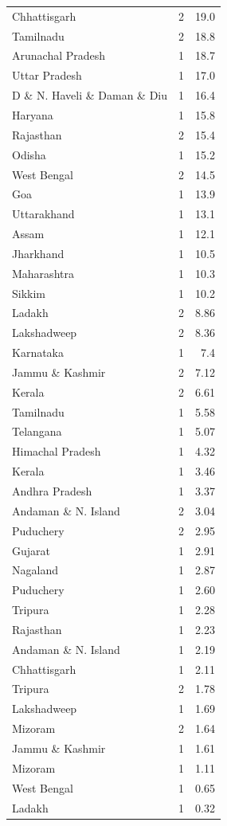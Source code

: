 \documentclass{article}
\begin{document}
\begin{longtable}{llr}
	Chhattisgarh & 2 & 19.0 \\
	Tamilnadu & 2 & 18.8 \\
	Arunachal Pradesh & 1 & 18.7 \\
	Uttar Pradesh & 1 & 17.0 \\
	D \& N. Haveli \& Daman \& Diu & 1 & 16.4 \\
	Haryana & 1 & 15.8 \\
	Rajasthan & 2 & 15.4 \\
	Odisha & 1 & 15.2 \\
	West Bengal & 2 & 14.5 \\
	Goa & 1 & 13.9 \\
	Uttarakhand & 1 & 13.1 \\
	Assam & 1 & 12.1 \\
	Jharkhand & 1 & 10.5 \\
	Maharashtra & 1 & 10.3 \\
	Sikkim & 1 & 10.2 \\
	Ladakh & 2 & 8.86 \\
	Lakshadweep & 2 & 8.36 \\
	Karnataka & 1 & 7.4 \\
	Jammu \& Kashmir & 2 & 7.12 \\
	Kerala & 2 & 6.61 \\
	Tamilnadu & 1 & 5.58 \\
	Telangana & 1 & 5.07 \\
	Himachal Pradesh & 1 & 4.32 \\
	Kerala & 1 & 3.46 \\
	Andhra Pradesh & 1 & 3.37 \\
	Andaman \& N. Island & 2 & 3.04 \\
	Puduchery & 2 & 2.95 \\
	Gujarat & 1 & 2.91 \\
	Nagaland & 1 & 2.87 \\
	Puduchery & 1 & 2.60 \\
	Tripura & 1 & 2.28 \\
	Rajasthan & 1 & 2.23 \\
	Andaman \& N. Island & 1 & 2.19 \\
	Chhattisgarh & 1 & 2.11 \\
	Tripura & 2 & 1.78 \\
	Lakshadweep & 1 & 1.69 \\
	Mizoram & 2 & 1.64 \\
	Jammu \& Kashmir & 1 & 1.61 \\
	Mizoram & 1 & 1.11 \\
	West Bengal & 1 & 0.65 \\
	Ladakh & 1 & 0.32 \\
	
\end{longtable}
\newpage
\end{document}
